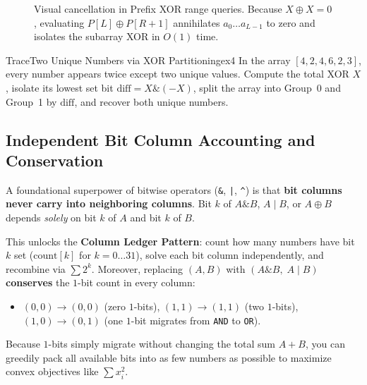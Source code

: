 \documentclass[11pt,a4paper]{article}
\theoremstyle{definition}
\begin{document}
\begin{figure}[htbp]
\caption{Visual cancellation in Prefix XOR range queries. Because $X \oplus X = 0$, evaluating $P[L] \oplus P[R+1]$ annihilates $a_0 \dots a_{L-1}$ to zero and isolates the subarray XOR in $O(1)$ time.}
\label{fig:prefix_xor}
\end{figure}

\begin{tryitbox}{Trace}{Two Unique Numbers via XOR Partitioning}{ex4}
In the array $[4, 2, 4, 6, 2, 3]$, every number appears twice except two unique values. Compute the total XOR $X$, isolate its lowest set bit $\text{diff} = X \mathbin{\&} (-X)$, split the array into Group~0 and Group~1 by $\text{diff}$, and recover both unique numbers.
\end{tryitbox}

\subsection{Independent Bit Column Accounting and Conservation}

A foundational superpower of bitwise operators (\texttt{\&}, \texttt{|}, \texttt{\textasciicircum}) is that \textbf{bit columns never carry into neighboring columns}. Bit $k$ of $A \mathbin{\&} B$, $A \mid B$, or $A \oplus B$ depends \emph{solely} on bit $k$ of $A$ and bit $k$ of $B$.

This unlocks the \textbf{Column Ledger Pattern}: count how many numbers have bit $k$ set ($\text{count}[k]$ for $k = 0 \dots 31$), solve each bit column independently, and recombine via $\sum 2^k$. Moreover, replacing $(A, B)$ with $(A \mathbin{\&} B,\; A \mid B)$ \textbf{conserves} the $1$-bit count in every column:
\begin{itemize}[itemsep=1pt, topsep=2pt]
    \item $(0, 0) \to (0, 0)$ (zero $1$-bits), \quad $(1, 1) \to (1, 1)$ (two $1$-bits), \quad $(1, 0) \to (0, 1)$ (one $1$-bit migrates from \texttt{AND} to \texttt{OR}).
\end{itemize}
Because $1$-bits simply migrate without changing the total sum $A + B$, you can greedily pack all available bits into as few numbers as possible to maximize convex objectives like $\sum x_i^2$.
\end{document}
